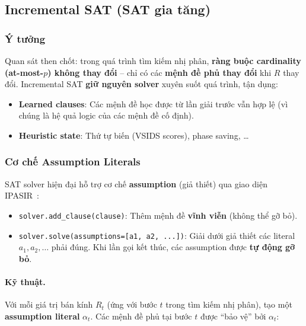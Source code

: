 \documentclass[11pt,a4paper]{article}
\begin{document}
\subsection{Incremental SAT (SAT gia tăng)}
\label{sec:incremental}

\subsubsection{Ý tưởng}

Quan sát then chốt: trong quá trình tìm kiếm nhị phân, \textbf{ràng buộc cardinality (at-most-$p$) không thay đổi} -- chỉ có các \textbf{mệnh đề phủ thay đổi} khi $R$ thay đổi.
Incremental SAT \textbf{giữ nguyên solver} xuyên suốt quá trình, tận dụng:
\begin{itemize}[nosep]
    \item \textbf{Learned clauses}: Các mệnh đề học được từ lần giải trước vẫn hợp lệ (vì chúng là hệ quả logic của các mệnh đề cố định).
    \item \textbf{Heuristic state}: Thứ tự biến (VSIDS scores), phase saving, \ldots
\end{itemize}

\subsubsection{Cơ chế Assumption Literals}

SAT solver hiện đại hỗ trợ cơ chế \textbf{assumption} (giả thiết) qua giao diện IPASIR~\cite{balyo2016ipasir}:

\begin{itemize}[nosep]
    \item \texttt{solver.add\_clause(clause)}: Thêm mệnh đề \textbf{vĩnh viễn} (không thể gỡ bỏ).
    \item \texttt{solver.solve(assumptions=[a1, a2, ...])}: Giải dưới giả thiết các literal $a_1, a_2, \dots$ phải đúng. Khi lần gọi kết thúc, các assumption được \textbf{tự động gỡ bỏ}.
\end{itemize}

\paragraph{Kỹ thuật.}
Với mỗi giá trị bán kính $R_t$ (ứng với bước $t$ trong tìm kiếm nhị phân), tạo một \textbf{assumption literal} $\alpha_t$.
Các mệnh đề phủ tại bước $t$ được ``bảo vệ'' bởi $\alpha_t$:
\end{document}
